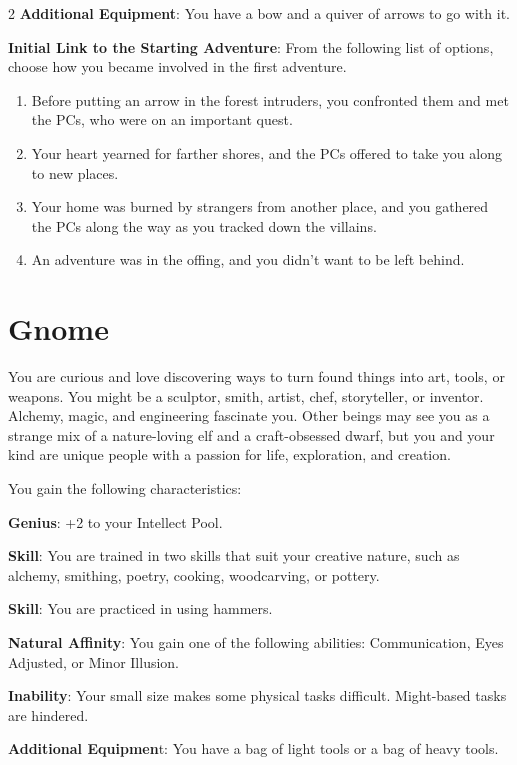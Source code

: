 \begin{multicols}{2}
\textbf{Additional Equipment}: You have a bow and a quiver of arrows to go with it.

\textbf{Initial Link to the Starting Adventure}: From the following list of options, choose how you became involved in the first adventure.

\begin{enumerate}
\item Before putting an arrow in the forest intruders, you confronted them and met the PCs, who were on an important quest.
\item Your heart yearned for farther shores, and the PCs offered to take you along to new places.
\item Your home was burned by strangers from another place, and you gathered the PCs along the way as you tracked down the villains.
\item An adventure was in the offing, and you didn’t want to be left behind.
\end{enumerate}

\section{Gnome}

You are curious and love discovering ways to turn found things into art, tools, or weapons. You might be a sculptor, smith, artist, chef, storyteller, or inventor. Alchemy, magic, and engineering fascinate you. Other beings may see you as a strange mix of a nature-loving elf and a craft-obsessed dwarf, but you and your kind are unique people with a passion for life, exploration, and creation. 

You gain the following characteristics: 

\textbf{Genius}: +2 to your Intellect Pool. 

\textbf{Skill}: You are trained in two skills that suit your creative nature, such as alchemy, smithing, poetry, cooking, woodcarving, or pottery. 

\textbf{Skill}: You are practiced in using hammers. 

\textbf{Natural Affinity}: You gain one of the following abilities: Communication, Eyes Adjusted, or Minor Illusion. 

\textbf{Inability}: Your small size makes some physical tasks difficult. Might-based tasks are hindered. 

\textbf{Additional Equipmen}t: You have a bag of light tools or a bag of heavy tools.


\end{multicols}
